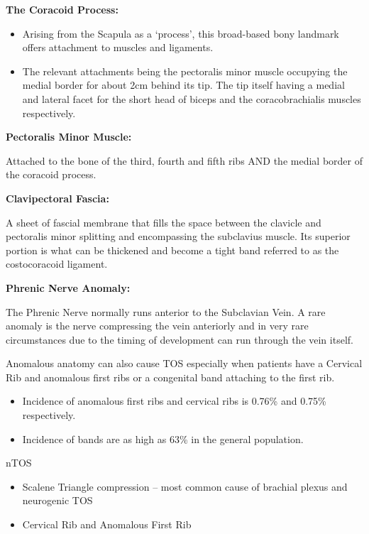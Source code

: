 \documentclass[
]{book}
\begin{document}
\textbf{The Coracoid Process:}~

\begin{itemize}
\item
  Arising from the Scapula as a `process', this broad-based bony
  landmark offers attachment to muscles and ligaments.
\item
  The relevant attachments being the pectoralis minor muscle occupying
  the medial border for about 2cm behind its tip. The tip itself
  having a medial and lateral facet for the short head of biceps and
  the coracobrachialis muscles respectively.
\end{itemize}

\textbf{Pectoralis Minor Muscle:}

Attached to the bone of the third, fourth and fifth ribs AND the medial
border of the coracoid process.~

\textbf{Clavipectoral Fascia:}

A sheet of fascial membrane that fills the space between the clavicle
and pectoralis minor splitting and encompassing the subclavius muscle.
Its superior portion is what can be thickened and become a tight band
referred to as the costocoracoid ligament.~

\textbf{Phrenic Nerve Anomaly:}

The Phrenic Nerve normally runs anterior to the Subclavian Vein. A rare
anomaly is the nerve compressing the vein anteriorly and in very rare
circumstances due to the timing of development can run through the vein
itself.

Anomalous anatomy can also cause TOS especially when patients have a
Cervical Rib and anomalous first ribs or a congenital band attaching to
the first rib.

\begin{itemize}
\item
  Incidence of anomalous first ribs and cervical ribs is 0.76\% and
  0.75\% respectively.~
\item
  Incidence of bands are as high as 63\% in the general population.
  \citet{humphries124ThoracicOutlet2019}
\end{itemize}

nTOS~~

\begin{itemize}
\item
  Scalene Triangle compression -- most common cause of brachial plexus
  and neurogenic TOS
\item
  Cervical Rib and Anomalous First Rib
\end{itemize}
\end{document}
